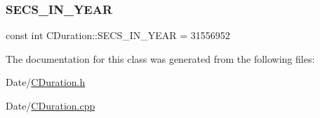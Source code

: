 \mbox{\label{class_c_duration_a73a041338527394a6758d4f80919eacc}} 
\subsubsection{\texorpdfstring{S\+E\+C\+S\+\_\+\+I\+N\+\_\+\+Y\+E\+AR}{SECS\_IN\_YEAR}}
{\footnotesize\ttfamily const int C\+Duration\+::\+S\+E\+C\+S\+\_\+\+I\+N\+\_\+\+Y\+E\+AR = 31556952\hspace{0.3cm}{\ttfamily [static]}}



The documentation for this class was generated from the following files\+:\begin{DoxyCompactItemize}
\item 
Date/\mbox{\hyperlink{_c_duration_8h}{C\+Duration.\+h}}\item 
Date/\mbox{\hyperlink{_c_duration_8cpp}{C\+Duration.\+cpp}}\end{DoxyCompactItemize}
